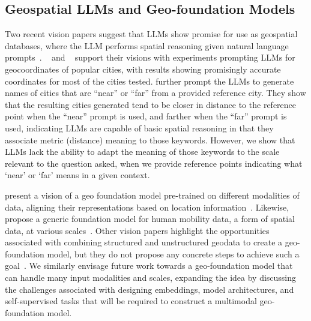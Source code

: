 \subsection{Geospatial LLMs and Geo-foundation Models}
Two recent vision papers suggest that LLMs show promise for use as geospatial databases, where the LLM performs spatial reasoning given natural language prompts~\cite{Bhandari2023, Qi2023}.
\citeauthor{Bhandari2023}~\cite{Bhandari2023} and \citeauthor{Qi2023}~\cite{Qi2023} support their visions with experiments prompting LLMs for geocoordinates of popular cities, with results showing promisingly accurate coordinates for most of the cities tested.
\citeauthor{Bhandari2023} further prompt the LLMs to generate names of cities that are ``near'' or ``far'' from a provided reference city.
They show that the resulting cities generated tend to be closer in distance to the reference point when the ``near'' prompt is used, and farther when the ``far'' prompt is used, indicating LLMs are capable of basic spatial reasoning in that they associate metric (distance) meaning to those keywords.
However, we show that LLMs lack the ability to adapt the meaning of those keywords to the scale relevant to the question asked, when we provide reference points indicating what `near' or `far' means in a given context.

\citeauthor{Mai2024} present a vision of a geo foundation model pre-trained on different modalities of data, aligning their representations based on location information~\cite{Mai2024}.
Likewise, \citeauthor{Fei2022} propose a generic foundation model for human mobility data, a form of spatial data, at various scales~\cite{Fei2022}.
Other vision papers highlight the opportunities associated with combining structured and unstructured geodata to create a geo-foundation model, but they do not propose any concrete steps to achieve such a goal~\cite{Xie2023, Tan2023}.
%
We similarly envisage future work towards a geo-foundation model that can handle many input modalities and scales, expanding the idea by discussing the challenges associated with designing embeddings, model architectures, and self-supervised tasks that will be required to construct a multimodal geo-foundation model.




